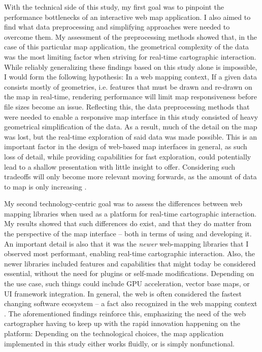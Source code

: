 With the technical side of this study, my first goal was to pinpoint
the performance bottlenecks of
an interactive web map application.
I also aimed to find what data preprocessing and simplifying approaches
were needed to overcome them.
My assessment of the preprocessing methods showed that, in the case of this particular
map application, the geometrical complexity of the data was the most limiting factor
when striving for real-time cartographic interaction.
While reliably generalizing these findings based on this study alone is impossible,
I would form the following hypothesis:
In a web mapping context, If a given data consists mostly of geometries, i.e.
features that must be drawn and re-drawn on the map in real-time,
rendering performance will limit map responsiveness before file sizes become an issue.
Reflecting this,
the data preprocessing methods that were needed
to enable a responsive map interface in this study
consisted of heavy geometrical simplification of the data.
As a result, much of the detail on the map was lost,
but the real-time exploration of said data was made possible.
This is an important factor in the design of
web-based map interfaces in general,
as such loss of detail, while providing capabilities for fast exploration,
could potentially lead to
a shallow presentation with little insight to offer.
Considering such tradeoffs will only become more relevant moving forwards,
as the amount of data to map is only increasing \parencite{kra2017}.

My second technology-centric goal was to assess
the differences between web mapping libraries
when used as a platform for real-time cartographic interaction.
My results showed that such differences do exist,
and that they do matter from the perspective of the map interface --
both in terms of using and developing it.
An important detail is also that
it was the \textit{newer} web-mapping libraries that I observed most performant,
enabling real-time cartographic interaction.
Also, the newer libraries included features and capabilities
that might today be considered essential,
without the need for plugins or self-made modifications.
Depending on the use case, such things could include GPU acceleration,
vector base maps, or UI framework integration.
In general, the web is often considered the fastest changing
software ecosystem \parencite{mik2019, tai2017} --
a fact also recognized in the web mapping context
\parencite{rot2014, vee2017}.
The aforementioned findings reinforce this, emphasizing the need of the web cartographer
having to keep up with the rapid innovation happening on the platform:
Depending on the technological choices, the map application implemented in this study
either works fluidly, or is simply nonfunctional.

